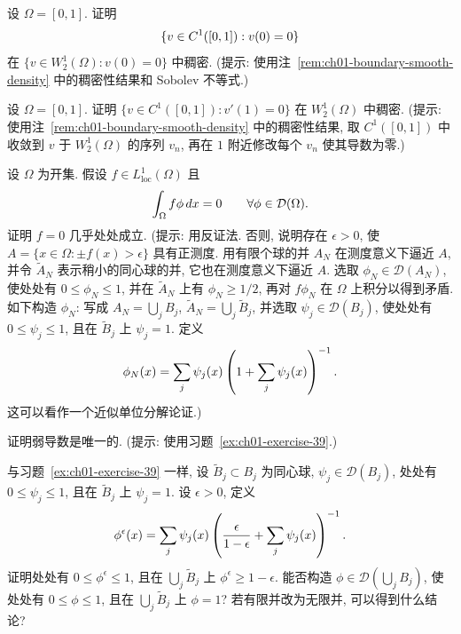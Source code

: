 \begin{MBExercise}
\label{ex:ch01-exercise-37}
设 $\Omega=[0,1]$. 证明
\[
\MathBookFormulaID{formula-ch01-exercise-37-dense-zero-value-smooth}
\{v\in C^1([0,1]):v(0)=0\}
\]
在 $\{v\in W_2^1(\Omega):v(0)=0\}$ 中稠密. (提示: 使用注~\ref{rem:ch01-boundary-smooth-density} 中的稠密性结果和 Sobolev 不等式.)
\end{MBExercise}

\begin{MBExercise}
\label{ex:ch01-exercise-38}
设 $\Omega=[0,1]$. 证明 $\{v\in C^1([0,1]):v'(1)=0\}$ 在 $W_2^1(\Omega)$ 中稠密. (提示: 使用注~\ref{rem:ch01-boundary-smooth-density} 中的稠密性结果, 取 $C^1([0,1])$ 中收敛到 $v$ 于 $W_2^1(\Omega)$ 的序列 $v_n$, 再在 $1$ 附近修改每个 $v_n$ 使其导数为零.)
\end{MBExercise}

\begin{MBExercise}
\label{ex:ch01-exercise-39}
设 $\Omega$ 为开集. 假设 $f\in L_{\mathrm{loc}}^1(\Omega)$ 且
\[
\MathBookFormulaID{formula-ch01-exercise-39-zero-distribution}
\int_\Omega f\phi\,dx=0
\qquad\forall\phi\in\mathcal D(\Omega).
\]
证明 $f=0$ 几乎处处成立. (提示: 用反证法. 否则, 说明存在 $\epsilon>0$, 使 $A=\{x\in\Omega:\pm f(x)>\epsilon\}$ 具有正测度. 用有限个球的并 $A_N$ 在测度意义下逼近 $A$, 并令 $\widetilde A_N$ 表示稍小的同心球的并, 它也在测度意义下逼近 $A$. 选取 $\phi_N\in\mathcal D(A_N)$, 使处处有 $0\leq\phi_N\leq1$, 并在 $\widetilde A_N$ 上有 $\phi_N\geq1/2$, 再对 $f\phi_N$ 在 $\Omega$ 上积分以得到矛盾. 如下构造 $\phi_N$: 写成 $A_N=\bigcup_jB_j$, $\widetilde A_N=\bigcup_j\widetilde B_j$, 并选取 $\psi_j\in\mathcal D(B_j)$, 使处处有 $0\leq\psi_j\leq1$, 且在 $\widetilde B_j$ 上 $\psi_j=1$. 定义
\[
\MathBookFormulaID{formula-ch01-exercise-39-partition-function}
\phi_N(x)=\sum_j\psi_j(x)\left(1+\sum_j\psi_j(x)\right)^{-1}.
\]
这可以看作一个近似单位分解论证.)
\end{MBExercise}

\begin{MBExercise}
\label{ex:ch01-exercise-40}
证明弱导数是唯一的. (提示: 使用习题~\ref{ex:ch01-exercise-39}.)
\end{MBExercise}

\begin{MBExercise}
\label{ex:ch01-exercise-41}
与习题~\ref{ex:ch01-exercise-39} 一样, 设 $\widetilde B_j\subset B_j$ 为同心球, $\psi_j\in\mathcal D(B_j)$, 处处有 $0\leq\psi_j\leq1$, 且在 $\widetilde B_j$ 上 $\psi_j=1$. 设 $\epsilon>0$, 定义
\[
\MathBookFormulaID{formula-ch01-exercise-41-partition-function}
\phi^\epsilon(x)=\sum_j\psi_j(x)
\left(\frac\epsilon{1-\epsilon}+\sum_j\psi_j(x)\right)^{-1}.
\]
证明处处有 $0\leq\phi^\epsilon\leq1$, 且在 $\bigcup_j\widetilde B_j$ 上 $\phi^\epsilon\geq1-\epsilon$. 能否构造 $\phi\in\mathcal D(\bigcup_jB_j)$, 使处处有 $0\leq\phi\leq1$, 且在 $\bigcup_j\widetilde B_j$ 上 $\phi=1$? 若有限并改为无限并, 可以得到什么结论?
\end{MBExercise}

